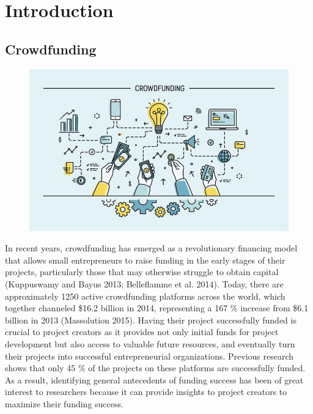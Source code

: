 

\setcounter{mtc}{6}

\chapter*{Introduction}
\label{chap:general_intorduction}
\minitoc
{}%
%
\section*{Crowdfunding}
\begin{figure}[!ht]
      \center
      \includegraphics[scale=0.55]{assets/crowdfunding.jpg}
      \label{fig:cwdfnd}
\end{figure}
In recent years, crowdfunding has emerged as a revolutionary financing model that allows small entrepreneurs to raise funding in the early stages of their projects, particularly those that may otherwise struggle to obtain capital (Kuppuswamy and Bayus 2013; Belleflamme et al. 2014). Today, there are approximately 1250 active crowdfunding platforms across the world, which together channeled \$16.2 billion in 2014, representing a 167 \% increase from \$6.1 billion in 2013 (Massolution 2015). Having their project successfully funded is crucial to project creators as it provides not only initial funds for project development but also access to valuable future resources, and eventually turn their projects into successful entrepreneurial organizations. Previous research shows that only 45 \% of the projects on these platforms are successfully funded. As a result, identifying general antecedents of funding success has been of great interest to researchers because it can provide insights to project creators to maximize their funding success.\\



